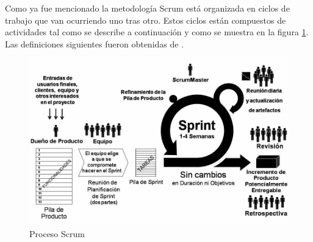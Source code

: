 Como ya fue mencionado la metodología Scrum está organizada en ciclos de trabajo que van ocurriendo uno tras otro. Estos ciclos están compuestos de actividades tal como se describe a continuación y como se muestra en la figura \ref{fig:scrum}. Las definiciones siguientes fueron obtenidas de \cite{DBLV09}.

\begin{figure}[h]
	\begin{center}
		\includegraphics[scale=0.35]{imagenes/scrum.png}
	\end{center}
	\caption{
		\label{fig:scrum}
		Proceso Scrum \cite{DBLV09}
	}
\end{figure}

